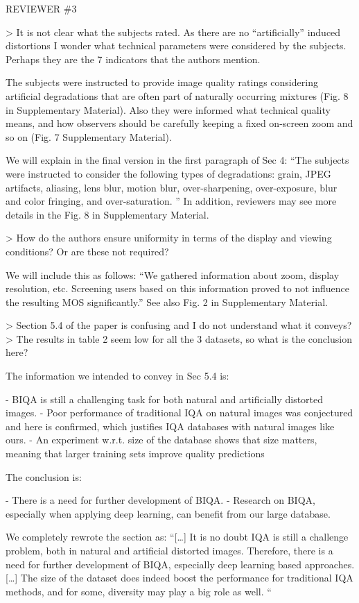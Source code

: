 \documentclass{article}
\begin{document}
REVIEWER \#3

> It is not clear what the subjects rated. As there are no “artificially” induced distortions I wonder what technical parameters were considered by the subjects. Perhaps they are the 7 indicators that the authors mention.

The subjects were instructed to provide image quality ratings considering artificial degradations that are often part of naturally occurring mixtures (Fig. 8 in Supplementary Material). Also they were informed what technical quality means, and how observers should be carefully keeping a fixed on-screen zoom and so on (Fig. 7 Supplementary Material). 

We will explain in the final version in the first paragraph of Sec 4:
“The subjects were instructed to consider the following types of degradations: grain, JPEG artifacts, aliasing, lens blur, motion blur, over-sharpening, over-exposure, blur and color fringing, and over-saturation. ” 
In addition, reviewers may see more details in the Fig. 8 in Supplementary Material.



> How do the authors ensure uniformity in terms of the display and viewing conditions? Or are these not required?

We will include this as follows:
“We gathered information about zoom, display resolution, etc. Screening users based on this information proved to not influence the resulting MOS significantly.”
See also Fig. 2 in Supplementary Material.


> Section 5.4 of the paper is confusing and I do not understand what it conveys? 
> The results in table 2 seem low for all the 3 datasets, so what is the conclusion here?

The information we intended to convey in Sec 5.4 is:

- BIQA is still a challenging task for both natural and artificially distorted images.
- Poor performance of traditional IQA on natural images was conjectured and here is confirmed, which justifies IQA databases with natural images like ours.
- An experiment w.r.t. size of the database shows that size matters, meaning that larger training sets improve quality predictions

The conclusion is:

- There is a need for further development of BIQA.
- Research on BIQA, especially when applying deep learning, can benefit from our large database. 

We completely rewrote the section as:
“[…] It is no doubt IQA is still a challenge problem, both in natural and artificial distorted images. Therefore, there is a need for further development of BIQA, especially deep learning based approaches. […] The size of the dataset does indeed boost the performance for traditional IQA methods, and for some, diversity may play a big role as well. “
\end{document}
